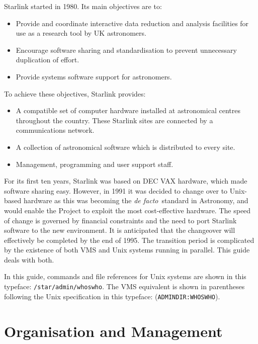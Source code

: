 Starlink started in 1980.
Its main objectives are to:
\begin{itemize}
\item Provide and coordinate interactive data reduction and analysis facilities
for use as a research tool by UK astronomers.
\item Encourage software sharing and standardisation to prevent unnecessary
duplication of effort.
\item Provide systems software support for astronomers.
\end{itemize}
To achieve these objectives, Starlink provides:
\begin{itemize}
\item A compatible set of computer hardware installed at astronomical centres
throughout the country.
These Starlink sites are connected by a communications network.
\item A collection of astronomical software which is distributed to every site.
\item Management, programming and user support staff.
\end{itemize}
For its first ten years, Starlink was based on DEC VAX hardware, which made
software sharing easy.
However, in 1991 it was decided to change over to Unix-based hardware as this
was becoming the {\em de facto}\, standard in Astronomy, and would enable the
Project to exploit the most cost-effective hardware.
The speed of change is governed by financial constraints and the need to
port Starlink software to the new environment.
It is anticipated that the changeover will effectively be completed by the
end of 1995.
The transition period is complicated by the existence of both VMS and Unix
systems running in parallel.
This guide deals with both.

In this guide, commands and file references for Unix systems are shown in
this typeface: {\tt /star/\-admin/\-whoswho}.
The VMS equivalent is shown in parentheses following the Unix specification
in this typeface: ({\tt ADMINDIR:\-WHOSWHO}).

\section{Organisation and Management}

